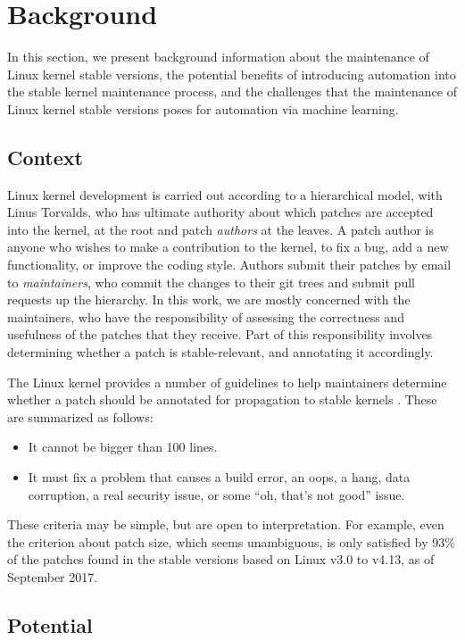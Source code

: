 \section{Background}
\label{sec:background}
In this section, we present background information about the maintenance of
Linux kernel stable versions, the potential benefits of introducing
automation into the stable kernel maintenance process, and the challenges
that the maintenance of Linux kernel stable versions poses for automation
via machine learning.

\subsection{Context}
\label{sec:context}
Linux kernel development is carried out according to a hierarchical model,
with Linus Torvalds, who has ultimate authority about which
patches are accepted into the kernel, at the root and patch {\em authors} at the
leaves. A patch author is anyone who wishes to make a contribution to the
kernel, to fix a bug, add a new functionality, or improve the coding
style. Authors submit their patches by email to {\em maintainers}, who
commit the changes to their git trees and submit pull requests up the
hierarchy. In this work, we are mostly concerned with the maintainers, who
have the responsibility of assessing the correctness and usefulness of the
patches that they receive. Part of this responsibility involves determining
whether a patch is stable-relevant, and annotating it accordingly.

The Linux kernel provides a number of guidelines to help maintainers
determine whether a patch should be annotated for propagation to stable
kernels \cite{stabledoc}. These are summarized as follows:
\begin{itemize}[leftmargin=0.4cm]
\item It cannot be bigger than 100 lines.
\item It must fix a problem that causes a build error, an oops, a hang, data corruption,
a real security issue, or some ``oh, that’s not good'' issue.
\end{itemize}
These criteria may be simple, but are open
to interpretation. For example, even the criterion about patch size, which
seems unambiguous, is only satisfied by 93\% of the patches found in the
stable versions based on Linux v3.0 to v4.13, as of September
2017. 

\subsection{Potential}


